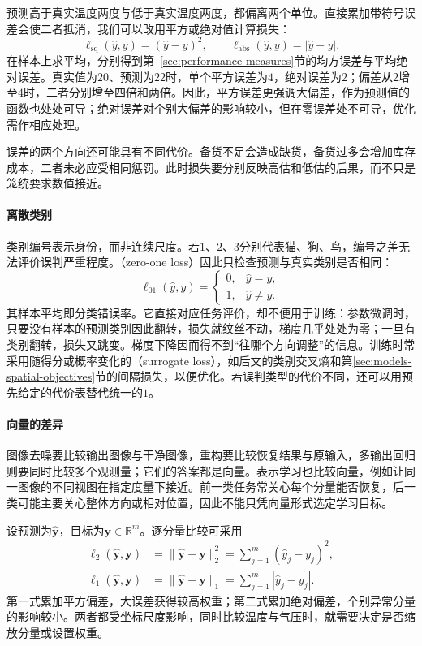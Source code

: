 预测高于真实温度两度与低于真实温度两度，都偏离两个单位。直接累加带符号误差会使二者抵消，我们可以改用平方或绝对值计算损失：
\[
  \ell_{\mathrm{sq}}(\hat y,y)=(\hat y-y)^2,\qquad
  \ell_{\mathrm{abs}}(\hat y,y)=|\hat y-y|.
\]
在样本上求平均，分别得到第~\ref{sec:performance-measures}节的均方误差与平均绝对误差。真实值为$20$、预测为$22$时，单个平方误差为$4$，绝对误差为$2$；偏差从$2$增至$4$时，二者分别增至四倍和两倍。因此，平方误差更强调大偏差，作为预测值的函数也处处可导；绝对误差对个别大偏差的影响较小，但在零误差处不可导，优化需作相应处理。

误差的两个方向还可能具有不同代价。备货不足会造成缺货，备货过多会增加库存成本，二者未必应受相同惩罚。此时损失要分别反映高估和低估的后果，而不只是笼统要求数值接近。

\paragraph{离散类别}

类别编号表示身份，而非连续尺度。若$1$、$2$、$3$分别代表猫、狗、鸟，编号之差无法评价误判严重程度。（zero-one loss）因此只检查预测与真实类别是否相同：
\begin{equation}
  \ell_{01}(\hat{y},y)=
  \begin{cases}
    0, & \hat{y}=y,\\
    1, & \hat{y}\ne y.
  \end{cases}
  \label{eq:models-zero-one-loss}
\end{equation}
其样本平均即分类错误率。它直接对应任务评价，却不便用于训练：参数微调时，只要没有样本的预测类别因此翻转，损失就纹丝不动，梯度几乎处处为零；一旦有类别翻转，损失又跳变。梯度下降因而得不到“往哪个方向调整”的信息。训练时常采用随得分或概率变化的（surrogate loss），如后文的类别交叉熵和第\ref{sec:models-spatial-objectives}节的间隔损失，以便优化。若误判类型的代价不同，还可以用预先给定的代价表替代统一的$1$。

\paragraph{向量的差异}
\label{sec:models-vector-objectives}

图像去噪要比较输出图像与干净图像，重构要比较恢复结果与原输入，多输出回归则要同时比较多个观测量；它们的答案都是向量。表示学习也比较向量，例如让同一图像的不同视图在指定度量下接近。前一类任务常关心每个分量能否恢复，后一类可能主要关心整体方向或相对位置，因此不能只凭向量形式选定学习目标。

设预测为$\hat{\bm{y}}$，目标为$\bm{y}\in\mathbb{R}^m$。逐分量比较可采用
\begin{align}
  \ell_2(\hat{\bm{y}},\bm{y})
    &=\lVert\hat{\bm{y}}-\bm{y}\rVert_2^2
      =\sum_{j=1}^{m}(\hat{y}_j-y_j)^2,
    \label{eq:models-vector-loss}\\
  \ell_1(\hat{\bm{y}},\bm{y})
    &=\lVert\hat{\bm{y}}-\bm{y}\rVert_1
      =\sum_{j=1}^{m}|\hat{y}_j-y_j|.
    \label{eq:models-vector-l1}
\end{align}
第一式累加平方偏差，大误差获得较高权重；第二式累加绝对偏差，个别异常分量的影响较小。两者都受坐标尺度影响，同时比较温度与气压时，就需要决定是否缩放分量或设置权重。


